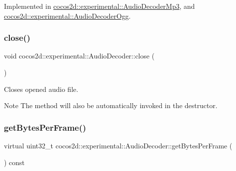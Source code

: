 Implemented in \hyperlink{classcocos2d_1_1experimental_1_1AudioDecoderMp3_a547b08590805b5f5443e8ba485e271b2}{cocos2d\+::experimental\+::\+Audio\+Decoder\+Mp3}, and \hyperlink{classcocos2d_1_1experimental_1_1AudioDecoderOgg_abca712fe6031eaebf98f6ac7eef64b0e}{cocos2d\+::experimental\+::\+Audio\+Decoder\+Ogg}.

\mbox{\label{classcocos2d_1_1experimental_1_1AudioDecoder_aa080c4ee1f7964f6660295ce325a64d5}} 
\subsubsection{\texorpdfstring{close()}{close()}\hspace{0.1cm}{\footnotesize\ttfamily [2/2]}}
{\footnotesize\ttfamily void cocos2d\+::experimental\+::\+Audio\+Decoder\+::close (\begin{DoxyParamCaption}{ }\end{DoxyParamCaption})}



Closes opened audio file. 

\begin{DoxyNote}{Note}
The method will also be automatically invoked in the destructor. 
\end{DoxyNote}
\mbox{\label{classcocos2d_1_1experimental_1_1AudioDecoder_aaa81e1943e6ec7dec5d376f4a81f54a1}} 
\subsubsection{\texorpdfstring{get\+Bytes\+Per\+Frame()}{getBytesPerFrame()}\hspace{0.1cm}{\footnotesize\ttfamily [1/2]}}
{\footnotesize\ttfamily virtual uint32\+\_\+t cocos2d\+::experimental\+::\+Audio\+Decoder\+::get\+Bytes\+Per\+Frame (\begin{DoxyParamCaption}{ }\end{DoxyParamCaption}) const\hspace{0.3cm}{\ttfamily [virtual]}}

